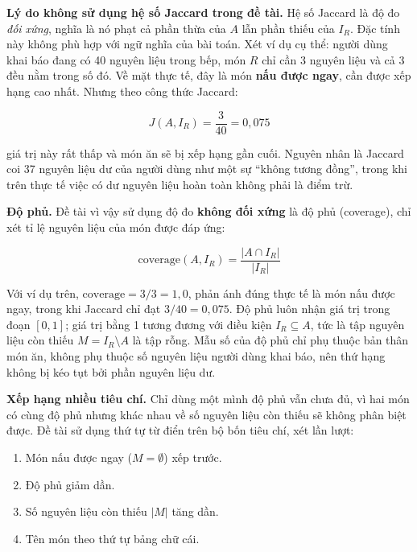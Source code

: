 \textbf{Lý do không sử dụng hệ số Jaccard trong đề tài.} Hệ số Jaccard là độ đo
\textit{đối xứng}, nghĩa là nó phạt cả phần thừa của $A$ lẫn phần thiếu của $I_R$.
Đặc tính này không phù hợp với ngữ nghĩa của bài toán. Xét ví dụ cụ thể: người
dùng khai báo đang có 40 nguyên liệu trong bếp, món $R$ chỉ cần 3 nguyên liệu và
cả 3 đều nằm trong số đó. Về mặt thực tế, đây là món \textbf{nấu được ngay}, cần
được xếp hạng cao nhất. Nhưng theo công thức Jaccard:

\begin{equation*}
J(A, I_R) = \frac{3}{40} = 0{,}075
\end{equation*}

giá trị này rất thấp và món ăn sẽ bị xếp hạng gần cuối. Nguyên nhân là Jaccard
coi 37 nguyên liệu dư của người dùng như một sự ``không tương đồng'', trong khi
trên thực tế việc có dư nguyên liệu hoàn toàn không phải là điểm trừ.

\textbf{Độ phủ.} Đề tài vì vậy sử dụng độ đo \textbf{không đối xứng} là độ phủ
(coverage), chỉ xét tỉ lệ nguyên liệu của món được đáp ứng:

\begin{equation}
\mathrm{coverage}(A, I_R) = \frac{|A \cap I_R|}{|I_R|}
\label{eq:coverage}
\end{equation}

Với ví dụ trên, $\mathrm{coverage} = 3/3 = 1{,}0$, phản ánh đúng thực tế là món
nấu được ngay, trong khi Jaccard chỉ đạt $3/40 = 0{,}075$. Độ phủ luôn nhận giá
trị trong đoạn $[0, 1]$; giá trị bằng 1 tương đương với điều kiện
$I_R \subseteq A$, tức là tập nguyên liệu còn thiếu $M = I_R \setminus A$ là tập
rỗng. Mẫu số của độ phủ chỉ phụ thuộc bản thân món ăn, không phụ thuộc số nguyên
liệu người dùng khai báo, nên thứ hạng không bị kéo tụt bởi phần nguyên liệu dư.

\textbf{Xếp hạng nhiều tiêu chí.} Chỉ dùng một mình độ phủ vẫn chưa đủ, vì hai
món có cùng độ phủ nhưng khác nhau về số nguyên liệu còn thiếu sẽ không phân biệt
được. Đề tài sử dụng thứ tự từ điển trên bộ bốn tiêu chí, xét lần lượt:

\begin{enumerate}[label=\arabic*.]
  \item Món nấu được ngay ($M = \emptyset$) xếp trước.
  \item Độ phủ giảm dần.
  \item Số nguyên liệu còn thiếu $|M|$ tăng dần.
  \item Tên món theo thứ tự bảng chữ cái.
\end{enumerate}


